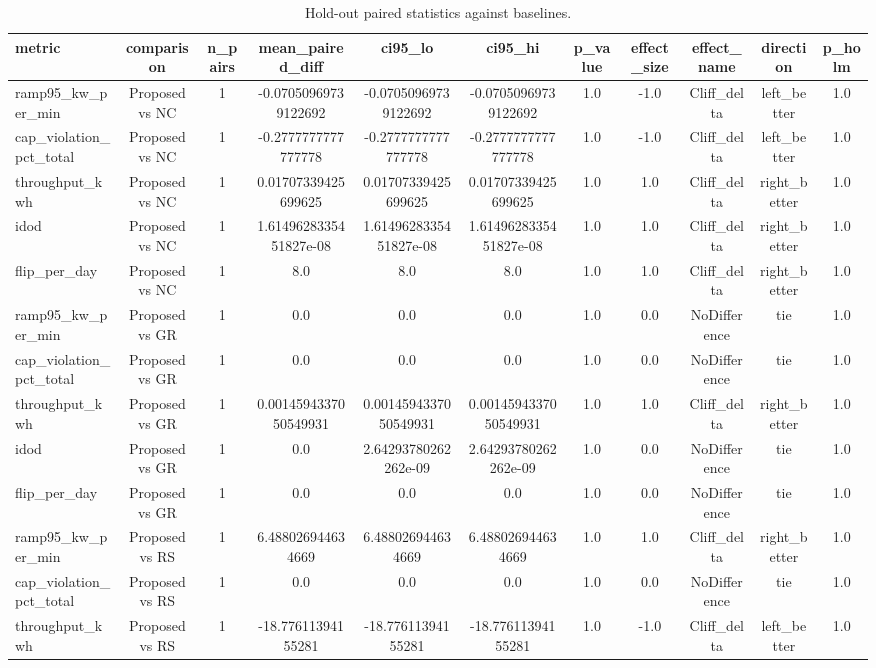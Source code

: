 \begin{table}[t]
\centering
\caption{Hold-out paired statistics against baselines.}
\label{tab:holdout_stats_auto}
\begin{tabular}{lcccccccccc}
\toprule
metric & comparison & n\_pairs & mean\_paired\_diff & ci95\_lo & ci95\_hi & p\_value & effect\_size & effect\_name & direction & p\_holm \\
\midrule
ramp95\_kw\_per\_min & Proposed vs NC & 1 & -0.07050969739122692 & -0.07050969739122692 & -0.07050969739122692 & 1.0 & -1.0 & Cliff\_delta & left\_better & 1.0 \\
cap\_violation\_pct\_total & Proposed vs NC & 1 & -0.2777777777777778 & -0.2777777777777778 & -0.2777777777777778 & 1.0 & -1.0 & Cliff\_delta & left\_better & 1.0 \\
throughput\_kwh & Proposed vs NC & 1 & 0.01707339425699625 & 0.01707339425699625 & 0.01707339425699625 & 1.0 & 1.0 & Cliff\_delta & right\_better & 1.0 \\
idod & Proposed vs NC & 1 & 1.6149628335451827e-08 & 1.6149628335451827e-08 & 1.6149628335451827e-08 & 1.0 & 1.0 & Cliff\_delta & right\_better & 1.0 \\
flip\_per\_day & Proposed vs NC & 1 & 8.0 & 8.0 & 8.0 & 1.0 & 1.0 & Cliff\_delta & right\_better & 1.0 \\
ramp95\_kw\_per\_min & Proposed vs GR & 1 & 0.0 & 0.0 & 0.0 & 1.0 & 0.0 & NoDifference & tie & 1.0 \\
cap\_violation\_pct\_total & Proposed vs GR & 1 & 0.0 & 0.0 & 0.0 & 1.0 & 0.0 & NoDifference & tie & 1.0 \\
throughput\_kwh & Proposed vs GR & 1 & 0.0014594337050549931 & 0.0014594337050549931 & 0.0014594337050549931 & 1.0 & 1.0 & Cliff\_delta & right\_better & 1.0 \\
idod & Proposed vs GR & 1 & 0.0 & 2.64293780262262e-09 & 2.64293780262262e-09 & 1.0 & 0.0 & NoDifference & tie & 1.0 \\
flip\_per\_day & Proposed vs GR & 1 & 0.0 & 0.0 & 0.0 & 1.0 & 0.0 & NoDifference & tie & 1.0 \\
ramp95\_kw\_per\_min & Proposed vs RS & 1 & 6.488026944634669 & 6.488026944634669 & 6.488026944634669 & 1.0 & 1.0 & Cliff\_delta & right\_better & 1.0 \\
cap\_violation\_pct\_total & Proposed vs RS & 1 & 0.0 & 0.0 & 0.0 & 1.0 & 0.0 & NoDifference & tie & 1.0 \\
throughput\_kwh & Proposed vs RS & 1 & -18.77611394155281 & -18.77611394155281 & -18.77611394155281 & 1.0 & -1.0 & Cliff\_delta & left\_better & 1.0 \\

\end{tabular}
\end{table}
